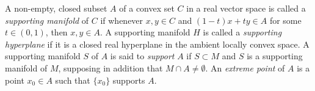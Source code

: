 A non-empty, closed subset $A$ of a convex set $C$ in a real vector space is called a \textit{supporting manifold} of $C$ if whenever $x, y \in C$ and $(1-t)x + ty \in A$ for some $t \in (0,1)$, then $x, y \in A$. A supporting manifold $H$ is called a \textit{supporting hyperplane} if it is a closed real hyperplane in the ambient locally convex space. A supporting manifold $S$ of $A$ is said to \textit{support} $A$ if $S \subset M$ and $S$ is a supporting manifold of $M$, supposing in addition that $M \cap A \neq \emptyset$. An \textit{extreme point} of $A$ is a point $x_0 \in A$ such that $\{x_0\}$ supports $A$.
